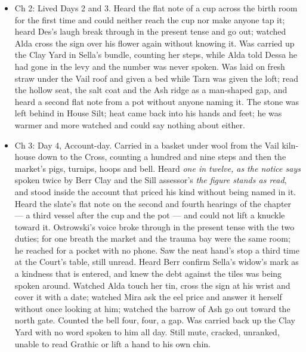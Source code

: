 \documentclass{design/chronicle}
\begin{document}
{\begin{itemize}[leftmargin=1.4em,itemsep=1pt,topsep=3pt,parsep=0pt]
\item Ch 2: Lived Days 2 and 3. Heard the flat note of a cup across the birth room for the first time and could neither reach the cup nor make anyone tap it; heard Des’s laugh break through in the present tense and go out; watched Alda cross the sign over his flower again without knowing it. Was carried up the Clay Yard in Sella’s bundle, counting her steps, while Alda told Dessa he had gone in the levy and the number was never spoken. Was laid on fresh straw under the Vail roof and given a bed while Tarn was given the loft; read the hollow seat, the salt coat and the Ash ridge as a man-shaped gap, and heard a second flat note from a pot without anyone naming it. The stone was left behind in House Silt; heat came back into his hands and feet; he was warmer and more watched and could say nothing about either.

\item Ch 3: Day 4, Account-day. Carried in a basket under wool from the Vail kiln-house down to the Cross, counting a hundred and nine steps and then the market’s pigs, turnips, hoops and bell. Heard \emph{one in twelve, as the notice says} spoken twice by Berr Clay and the Sill assessor’s \emph{the figure stands as read}, and stood inside the account that priced his kind without being named in it. Heard the slate’s flat note on the second and fourth hearings of the chapter --- a third vessel after the cup and the pot --- and could not lift a knuckle toward it. Ostrowski’s voice broke through in the present tense with the two duties; for one breath the market and the trauma bay were the same room; he reached for a pocket with no phone. Saw the neat hand’s stop a third time at the Court’s table, still unread. Heard Berr confirm Sella’s widow’s mark as a kindness that is entered, and knew the debt against the tiles was being spoken around. Watched Alda touch her tin, cross the sign at his wrist and cover it with a date; watched Mira ask the eel price and answer it herself without once looking at him; watched the barrow of Ash go out toward the north gate. Counted the bell four, four, a gap. Was carried back up the Clay Yard with no word spoken to him all day. Still mute, cracked, unranked, unable to read Grathic or lift a hand to his own chin.

\end{itemize}

\begin{itemize}[leftmargin=1.4em,itemsep=1pt,topsep=3pt,parsep=0pt]


\end{itemize}}
\end{document}
